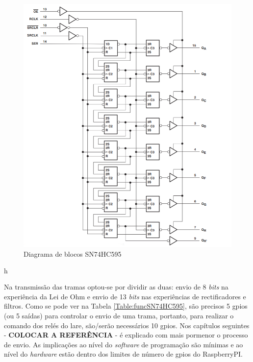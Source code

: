 \begin{figure}[hbtp]
    \centering
    \includegraphics[width=1\textwidth]{figures/SR_blocos.png}
    \caption{Diagrama de blocos SN74HC595 \cite{SN74HC595}}
    \label{fig:SN74HC595blocos}
\end{figure}h

Na transmissão das tramas optou-se por dividir as duas: envio de 8 \textit{bits} na experiência da Lei de Ohm e envio de 13 \textit{bits} nas experiências de rectificadores e filtros. Como se pode ver na Tabela \ref{Table:funcSN74HC595}, são precisos 5 \acrshort{gpio}s (ou 5 saídas) para controlar o envio de uma trama, portanto, para realizar o comando dos relés do \acrshort{lare}, são/serão necessários 10 \acrshort{gpio}s.
Nos capítulos seguintes - \textbf{COLOCAR A REFERÊNCIA} - é explicado com mais pormenor o processo de envio. As implicações ao nível do \textit{software} de programação são mínimas e ao nível do \textit{hardware} estão dentro dos limites de número de \acrshort{gpio}s do \gls{RaspberryPI}.

